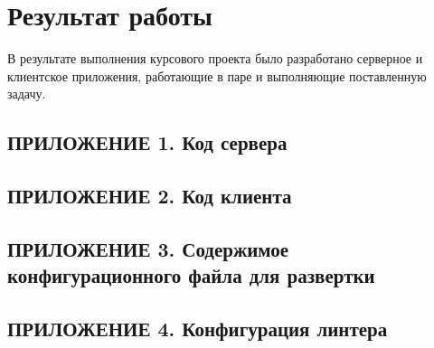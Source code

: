 \documentclass[a4paper, 12pt]{article}
\begin{document}
    \section*{Результат работы}
    В результате выполнения курсового проекта было разработано серверное и клиентское приложения,
    работающие в паре и выполняющие поставленную задачу.

    \newpage
    \subsection*{ПРИЛОЖЕНИЕ 1. Код сервера}
    

    \newpage
    \subsection*{ПРИЛОЖЕНИЕ 2. Код клиента}
    

    \newpage
    \subsection*{ПРИЛОЖЕНИЕ 3. Содержимое конфигурационного файла для развертки}
    

    \newpage
    \subsection*{ПРИЛОЖЕНИЕ 4. Конфигурация линтера}
    
\end{document}
